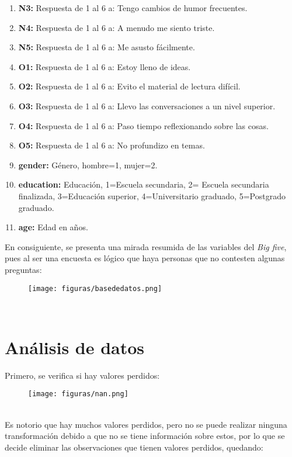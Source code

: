 \documentclass{report}
\begin{document}
\begin{enumerate}
    \item \textbf{N3:} Respuesta de 1 al 6 a: Tengo cambios de humor frecuentes.
    \item \textbf{N4:} Respuesta de 1 al 6 a: A menudo me siento triste.
    \item \textbf{N5:} Respuesta de 1 al 6 a: Me asusto fácilmente.
    \item \textbf{O1:} Respuesta de 1 al 6 a: Estoy lleno de ideas.
    \item \textbf{O2:} Respuesta de 1 al 6 a: Evito el material de lectura difícil.
    \item \textbf{O3:} Respuesta de 1 al 6 a: Llevo las conversaciones a un nivel superior.
    \item \textbf{O4:} Respuesta de 1 al 6 a: Paso tiempo reflexionando sobre las cosas.
    \item \textbf{O5:} Respuesta de 1 al 6 a: No profundizo en temas.
    \item \textbf{gender:} Género, hombre=1, mujer=2.
    \item \textbf{education:} Educación, 1=Escuela secundaria, 2= Escuela secundaria finalizada, 3=Educación superior, 4=Universitario graduado, 5=Postgrado graduado.
    \item \textbf{age:} Edad en años.
\end{enumerate}


En consiguiente, se presenta una mirada resumida de las variables del \textit{Big five}, pues al ser una encuesta es lógico que haya personas que no contesten algunas preguntas:\\
\begin{figure}[htp]
        \centering
    	\texttt{[image: figuras/basededatos.png]}
    	\label{fig: Figura1}
\end{figure}\\

\newpage
\section{Análisis de datos}
Primero, se verifica si hay valores perdidos:\\

\begin{figure}[htp]
        \centering
    	\texttt{[image: figuras/nan.png]}
    	\label{fig: Figura1}
\end{figure}\\

Es notorio que hay muchos valores perdidos, pero no se puede realizar ninguna transformación debido a que no se tiene información sobre estos, por lo que se decide eliminar las observaciones que tienen valores perdidos, quedando:\\
\end{document}
